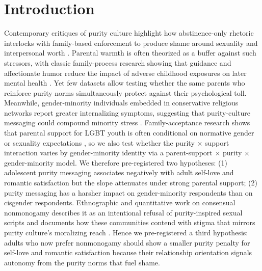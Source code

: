 \documentclass[12pt]{article}
\begin{document}
\section{Introduction}
Contemporary critiques of purity culture highlight how abstinence-only rhetoric interlocks with family-based enforcement to produce shame around sexuality and interpersonal worth \cite{Klement2022}. Parental warmth is often theorized as a buffer against such stressors, with classic family-process research showing that guidance and affectionate humor reduce the impact of adverse childhood exposures on later mental health \cite{Franck2007}. Yet few datasets allow testing whether the same parents who reinforce purity norms simultaneously protect against their psychological toll. Meanwhile, gender-minority individuals embedded in conservative religious networks report greater internalizing symptoms, suggesting that purity-culture messaging could compound minority stress \cite{Skidmore2022,Lekwauwa2022}. Family-acceptance research shows that parental support for LGBT youth is often conditional on normative gender or sexuality expectations \cite{Ryan2009}, so we also test whether the purity × support interaction varies by gender-minority identity via a parent-support × purity × gender-minority model. We therefore pre-registered two hypotheses: (1) adolescent purity messaging associates negatively with adult self-love and romantic satisfaction but the slope attenuates under strong parental support; (2) purity messaging has a harsher impact on gender-minority respondents than on cisgender respondents. Ethnographic and quantitative work on consensual nonmonogamy describes it as an intentional refusal of purity-inspired sexual scripts and documents how these communities contend with stigma that mirrors purity culture’s moralizing reach \cite{Conley2013,Stults2023}. Hence we pre-registered a third hypothesis: adults who now prefer nonmonogamy should show a smaller purity penalty for self-love and romantic satisfaction because their relationship orientation signals autonomy from the purity norms that fuel shame.
\end{document}
